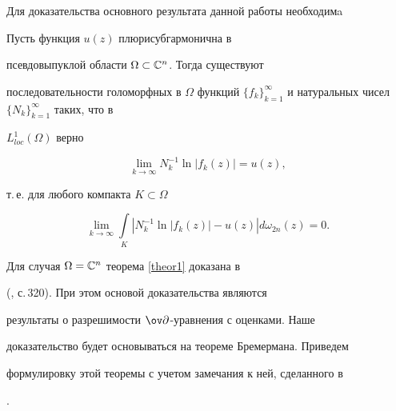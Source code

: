 Для доказательства основного результата данной работы необходимa





\begin{thm}\label{theor1}


Пусть функция $u(z)$ плюрисубгармонична в 


псевдовыпуклой области $\Omega\subset\Bbb C^n$. Тогда существуют 


последовательности голоморфных в $\Omega$ функций $\{f_k\}_{k=1}^


{\infty}$ и натуральных чисел $\{N_k\}_{k=1}^{\infty}$ таких, что в 


$L^1_{loc}(\Omega)$ верно


$$


\lim\limits_{k\to\infty}N_k^{-1}\ln|f_k(z)|=u(z),


$$


т.\,е. для любого компакта $K\subset\Omega$ 


$$


\lim\limits_{k\to\infty}\int\limits_{K}


\left|N_k^{-1}\ln|f_k(z)|-u(z)\right|d\omega_{2n}(z)=0.


$$


\end{thm}





Для случая $\Omega = \Bbb C^n$ теорема \ref{theor1} доказана в


(\cite{Horm2}, с.\,320). При этом основой доказательства являются 


результаты о разрешимости $\ov\partial$-уравнения с оценками. Наше 


доказательство будет основываться на теореме Бремермана. Приведем 


формулировку этой теоремы с учетом замечания к ней, сделанного в 


\cite{Sadul2}. 





	


